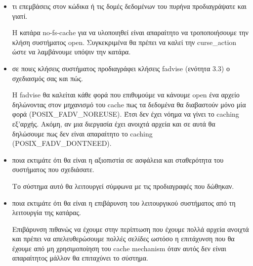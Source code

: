 \documentclass[a4paper,11pt]{article} \usepackage{anysize}
\begin{document}
\begin{itemize}

    \item τι επεμβάσεις στον κώδικα ή τις δομές δεδομένων του πυρήνα προδιαγράψατε και γιατί.

        Η κατάρα no-fs-cache για να υλοποιηθεί είναι απαραίτητο να
        τροποποιήσουμε την κλήση συστήματος open. Συγκεκριμένα θα πρέπει να
        καλεί την curse\_action ώστε να λαμβάνουμε υπόψιν την κατάρα.

    \item σε ποιες κλήσεις συστήματος προδιαγράφει κλήσεις fadvise (ενότητα 3.3) ο σχεδιασμός σας και πώς.

        Η fadvise θα καλείται κάθε φορά που επιθυμούμε να κάνουμε open ένα
        αρχείο δηλώνοντας στον μηχανισμό του cache πως τα δεδομένα θα
        διαβαστούν μόνο μία φορά (POSIX\_FADV\_NOREUSE). Έτσι δεν έχει νόημα να γίνει το caching
        εξ'αρχής. Ακόμη, αν μια διεργασία έχει ανοιχτά αρχεία και σε αυτά θα
        δηλώσουμε πως δεν είναι απαραίτητο το caching (POSIX\_FADV\_DONTNEED).

    \item ποια εκτιμάτε ότι θα είναι η αξιοπιστία σε ασφάλεια και σταθερότητα του συστήματος που σχεδιάσατε.

        Το σύστημα αυτό θα λειτουργεί σύμφωνα με τις προδιαγραφές που δώθηκαν.

    \item ποια εκτιμάτε ότι θα είναι η επιβάρυνση του λειτουργικού συστήματος από τη λειτουργία της κατάρας.

        Επιβάρυνση πιθανώς να έχουμε στην περίπτωση που έχουμε πολλά αρχεία
        ανοιχτά και πρέπει να απελευθερώσουμε πολλές σελίδες ωστόσο η
        επιτάχυνση που θα έχουμε από μη χρησιμοποίηση του cache mechanism όταν
        αυτός δεν είναι απαραίτητος μάλλον θα επιταχύνει το σύστημα.
\end{itemize}
\end{document}
